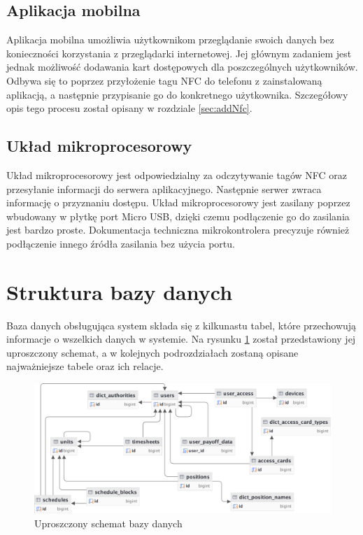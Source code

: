 \subsection{Aplikacja mobilna}

Aplikacja mobilna umożliwia użytkownikom przeglądanie swoich danych bez konieczności korzystania z przeglądarki internetowej. Jej głównym zadaniem jest jednak możliwość dodawania kart dostępowych dla poszczególnych użytkowników. Odbywa się to poprzez przyłożenie tagu NFC do telefonu z zainstalowaną aplikacją, a następnie przypisanie go do konkretnego użytkownika. Szczegółowy opis tego procesu został opisany w rozdziale \ref{sec:addNfc}.

\subsection{Układ mikroprocesorowy}

Układ mikroprocesorowy jest odpowiedzialny za odczytywanie tagów NFC oraz przesyłanie informacji do serwera aplikacyjnego. Następnie serwer zwraca informację o przyznaniu dostępu. Układ mikroprocesorowy jest zasilany poprzez wbudowany w płytkę port Micro USB, dzięki czemu podłączenie go do zasilania jest bardzo proste. Dokumentacja techniczna mikrokontrolera \cite{bib:picoWdatasheet} precyzuje również podłączenie innego źródła zasilania bez użycia portu.

\section{Struktura bazy danych}

Baza danych obsługująca system składa się z kilkunastu tabel, które przechowują informacje o wszelkich danych w systemie. Na rysunku \ref{fig:dbDiagram} został przedstawiony jej uproszczony schemat, a w kolejnych podrozdziałach zostaną opisane najważniejsze tabele oraz ich relacje.

\begin{figure}[H]
    \centering
    \includegraphics[width=\textwidth]{graf/dbDiagram.png}
    \caption{Uproszczony schemat bazy danych}
    \label{fig:dbDiagram}
\end{figure}

